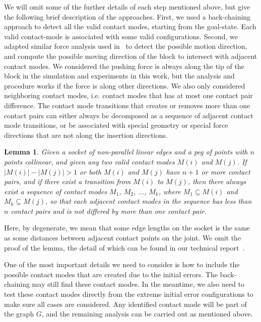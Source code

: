 \documentclass[letterpaper, 10 pt, conference]{ieeeconf}
\newtheorem{lemma}[theorem]{Lemma}
\begin{document}
We will omit some of the further details of each step mentioned above, but give the following brief description of the approaches. First, we used a back-chaining approach to detect all the valid contact modes, starting from the goal-state. Each valid contact-mode is associated with some valid configurations. Second, we adapted similar force analysis used in~\cite{} to detect the possible motion direction, and compute the possible moving direction of the block to intersect with adjacent contact modes. We considered the pushing force is always along the tip of the block in the simulation and experiments in this work, but the analysis and procedure works if the force is along other directions. We also only considered neighboring contact modes, i.e. contact modes that has at most one contact pair difference. The contact mode transitions that creates or removes more than one contact pairs can either always be decomposed as a sequence of adjacent contact mode transitions, or be associated with special geometry or special force directions that are not along the insertion directions.

\begin{lemma}
Given a socket of non-parallel linear edges and a peg of points with $n$ points collinear, and given any two valid contact modes $M(i)$ and $M(j)$. If $|M(i)| - |M(j)| > 1$ or both $M(i)$ and $M(j)$ have $n+1$ or more contact pairs, and if there exist a transition from $M(i)$ to $M(j)$, then there always exist a sequence of contact modes $M_1$, $M_2$, $\ldots$, $M_k$, where $M_1 \subseteq M(i)$ and $M_k \subseteq M(j)$,  so that each adjacent contact modes in the sequence has less than $n$ contact pairs and is not differed by more than one contact pair.
\end{lemma}

Here, by degenerate, we mean that some edge lengths on the socket is the same as some distances between adjacent contact points on the joint. We omit the proof of the lemma, the detail of which can be found in our technical report~\cite{}. 

One of the most important details we need to consider is how to include the possible contact modes that are created due to the initial errors. The back-chaining may still find these contact modes. In the meantime, we also need to test these contact modes directly from the extreme initial error configurations to make sure all cases are considered. Any identified contact mode will be part of the graph $G$, and the remaining analysis can be carried out as mentioned above. 
\end{document}
